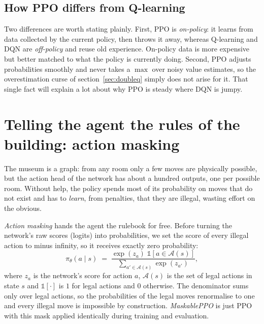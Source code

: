 \documentclass[11pt]{article}
\newcommand{\key}[1]{\textit{#1}}            %
\begin{document}
\subsection{How PPO differs from Q-learning}

Two differences are worth stating plainly. First, PPO is \key{on-policy}: it learns from
data collected by the current policy, then throws it away, whereas Q-learning and DQN are
\key{off-policy} and reuse old experience. On-policy data is more expensive but better
matched to what the policy is currently doing. Second, PPO adjusts probabilities smoothly
and never takes a $\max$ over noisy value estimates, so the overestimation curse of
section~\ref{sec:doubleq} simply does not arise for it. That single fact will explain a lot about why PPO
is steady where DQN is jumpy.

\section{Telling the agent the rules of the building: action masking}

The museum is a graph: from any room only a few moves are physically possible, but the
action head of the network has about a hundred outputs, one per possible room. Without
help, the policy spends most of its probability on moves that do not exist and has to
\emph{learn}, from penalties, that they are illegal, wasting effort on the obvious.

\key{Action masking} hands the agent the rulebook for free. Before turning the network's
raw scores (logits) into probabilities, we set the score of every illegal action to minus
infinity, so it receives exactly zero probability:
\begin{equation}
\pi_\theta(a\mid s)\;=\;\frac{\exp(z_a)\;\mathbb{1}[a\in\mathcal A(s)]}{\sum_{a'\in\mathcal A(s)}\exp(z_{a'})},
\label{eq:mask}
\end{equation}
where $z_a$ is the network's score for action $a$, $\mathcal A(s)$ is the set of legal
actions in state $s$ and $\mathbb{1}[\cdot]$ is $1$ for legal actions and $0$ otherwise.
The denominator sums only over legal actions, so the probabilities of the legal moves
renormalise to one and every illegal move is impossible by construction. \key{MaskablePPO}
is just PPO with this mask applied identically during training and evaluation.
\end{document}
